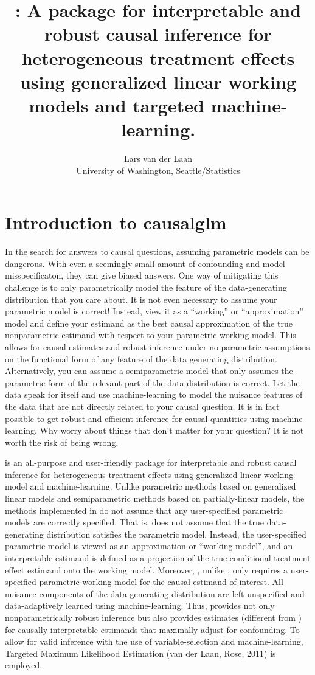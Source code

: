 \documentclass[
]{jss}
\author{
Lars van der Laan\\University of Washington, Seattle/Statistics
}
\title{\pkg{causalglm}: A \pkg{tlverse} \proglang{R} package for interpretable
and robust causal inference for heterogeneous treatment effects using
generalized linear working models and targeted machine-learning.}
\begin{document}
\hypertarget{introduction-to-causalglm}{%
\section{Introduction to causalglm}\label{introduction-to-causalglm}}

In the search for answers to causal questions, assuming parametric
models can be dangerous. With even a seemingly small amount of
confounding and model misspecificaton, they can give biased answers. One
way of mitigating this challenge is to only parametrically model the
feature of the data-generating distribution that you care about. It is
not even necessary to assume your parametric model is correct! Instead,
view it as a ``working'' or ``approximation'' model and define your
estimand as the best causal approximation of the true nonparametric
estimand with respect to your parametric working model. This allows for
causal estimates and robust inference under no parametric assumptions on
the functional form of any feature of the data generating distribution.
Alternatively, you can assume a semiparametric model that only assumes
the parametric form of the relevant part of the data distribution is
correct. Let the data speak for itself and use machine-learning to model
the nuisance features of the data that are not directly related to your
causal question. It is in fact possible to get robust and efficient
inference for causal quantities using machine-learning. Why worry about
things that don't matter for your question? It is not worth the risk of
being wrong.

 is an all-purpose and user-friendly package for
interpretable and robust causal inference for heterogeneous treatment
effects using generalized linear working model and machine-learning.
Unlike parametric methods based on generalized linear models and
semiparametric methods based on partially-linear models, the methods
implemented in  do not assume that any user-specified
parametric models are correctly specified. That is,  does
not assume that the true data-generating distribution satisfies the
parametric model. Instead, the user-specified parametric model is viewed
as an approximation or ``working model'', and an interpretable estimand
is defined as a projection of the true conditional treatment effect
estimand onto the working model. Moreover, , unlike
, only requires a user-specified parametric working model for
the causal estimand of interest. All nuisance components of the
data-generating distribution are left unspecified and data-adaptively
learned using machine-learning. Thus,  provides not only
nonparametrically robust inference but also provides estimates
(different from ) for causally interpretable estimands that
maximally adjust for confounding. To allow for valid inference with the
use of variable-selection and machine-learning, Targeted Maximum
Likelihood Estimation (van der Laan, Rose, 2011) is employed.
\end{document}
